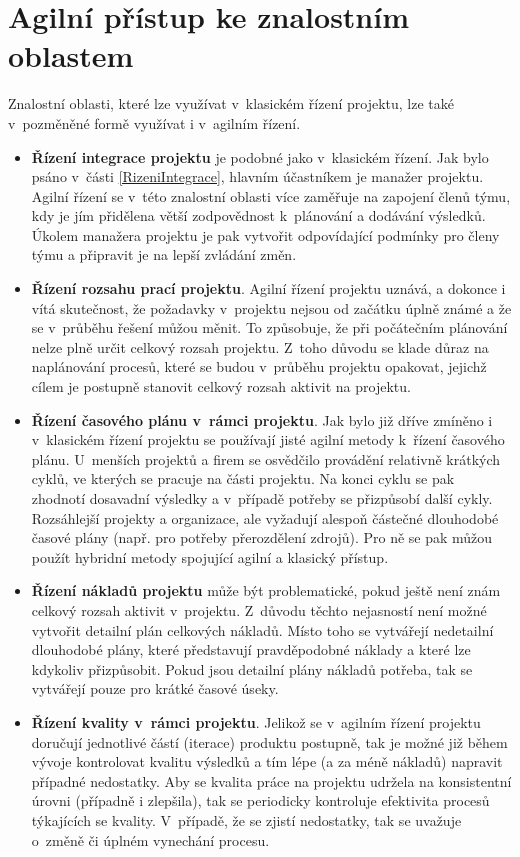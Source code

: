 \section{Agilní přístup ke znalostním oblastem}
Znalostní oblasti, které lze využívat v~klasickém řízení projektu, lze také v~pozměněné formě využívat i v~agilním řízení. 

\begin{itemize}
    \item \textbf{Řízení integrace projektu} je podobné jako v~klasickém řízení. Jak bylo psáno v~části \ref{RizeniIntegrace}, hlavním účastníkem je manažer projektu. Agilní řízení se v~této znalostní oblasti více zaměřuje na zapojení členů týmu, kdy je jím přidělena větší zodpovědnost k~plánování a dodávání výsledků. Úkolem manažera projektu je pak vytvořit odpovídající podmínky pro členy týmu a připravit je na lepší zvládání změn.
    \item \textbf{Řízení rozsahu prací projektu}. Agilní řízení projektu uznává, a dokonce i vítá skutečnost, že požadavky v~projektu nejsou od začátku úplně známé a že se v~průběhu řešení můžou měnit. To způsobuje, že při počátečním plánování nelze plně určit celkový rozsah projektu. Z~toho důvodu se klade důraz na naplánování procesů, které se budou v~průběhu projektu opakovat, jejichž cílem je postupně stanovit celkový rozsah aktivit na projektu.
    \item \textbf{Řízení časového plánu v~rámci projektu}. Jak bylo již dříve zmíněno i v~klasickém řízení projektu se používají jisté agilní metody k~řízení časového plánu. U~menších projektů a firem se osvědčilo provádění relativně krátkých cyklů, ve kterých se pracuje na části projektu. Na konci cyklu se pak zhodnotí dosavadní výsledky a v~případě potřeby se přizpůsobí další cykly. Rozsáhlejší projekty a organizace, ale vyžadují alespoň částečné dlouhodobé časové plány (např. pro potřeby přerozdělení zdrojů). Pro ně se pak můžou použít hybridní metody spojující agilní a klasický přístup. 
    \item \textbf{Řízení nákladů projektu} může být problematické, pokud ještě není znám celkový rozsah aktivit v~projektu. Z~důvodu těchto nejasností není možné vytvořit detailní plán celkových nákladů. Místo toho se vytvářejí nedetailní dlouhodobé plány, které představují pravděpodobné náklady a které lze kdykoliv přizpůsobit. Pokud jsou detailní plány nákladů potřeba, tak se vytvářejí pouze pro krátké časové úseky.
    \item \textbf{Řízení kvality v~rámci projektu}. Jelikož se v~agilním řízení projektu doručují jednotlivé částí (iterace) produktu postupně, tak je možné již během vývoje kontrolovat kvalitu výsledků a tím lépe (a za méně nákladů) napravit případné nedostatky. Aby se kvalita práce na projektu udržela na konsistentní úrovni (případně i zlepšila), tak se periodicky kontroluje efektivita procesů týkajících se kvality. V~případě, že se zjistí nedostatky, tak se uvažuje o~změně či úplném vynechání procesu.

\end{itemize}

